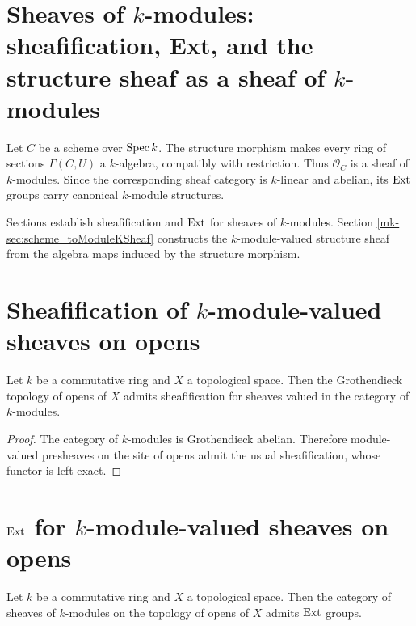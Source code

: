 \section{Sheaves of \(k\)-modules: sheafification, Ext, and the structure sheaf as a sheaf of \(k\)-modules}
\label{mk-chap:Cohomology_StructureSheafModuleK}

Let \(C\) be a scheme over \(\operatorname{Spec} k\). The structure morphism makes every ring of sections \(\Gamma(C,U)\) a \(k\)-algebra, compatibly with restriction. Thus \(\mathcal O_C\) is a sheaf of \(k\)-modules. Since the corresponding sheaf category is \(k\)-linear and abelian, its \(\operatorname{Ext}\) groups carry canonical \(k\)-module structures.

Sections  establish sheafification and \(\operatorname{Ext}\) for sheaves of \(k\)-modules. Section \ref{mk-sec:scheme_toModuleKSheaf} constructs the \(k\)-module-valued structure sheaf from the algebra maps induced by the structure morphism.

\section{Sheafification of \(k\)-module-valued sheaves on opens}
\label{mk-sec:moduleK_prereqs}

\begin{theorem}\label{mk-thm:HasSheafify_Opens_ModuleCatK}
  \leanok

  Let \(k\) be a commutative ring and \(X\) a topological space. Then the Grothendieck topology of opens of \(X\) admits sheafification for sheaves valued in the category of \(k\)-modules.
\end{theorem}

\begin{proof}
  \leanok


The category of \(k\)-modules is Grothendieck abelian. Therefore module-valued presheaves on the site of opens admit the usual sheafification, whose functor is left exact.
\end{proof}

\section{\(\operatorname{Ext}\) for \(k\)-module-valued sheaves on opens}
\label{mk-sec:moduleK_ext}

\begin{theorem}\label{mk-thm:HasExt_Sheaf_Opens_ModuleCatK}
  \leanok


  Let \(k\) be a commutative ring and \(X\) a topological space. Then the category of sheaves of \(k\)-modules on the topology of opens of \(X\) admits \(\operatorname{Ext}\) groups.
\end{theorem}

